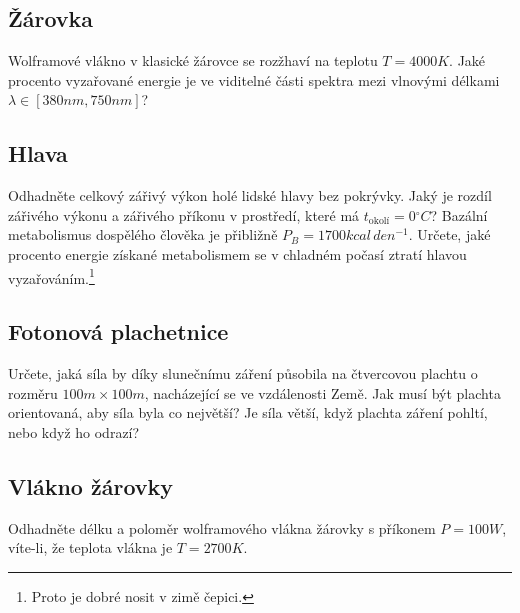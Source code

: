\subsection{Žárovka}
    Wolframové vlákno v klasické žárovce se rozžhaví na teplotu $T=4000\unit{K}$.
    Jaké procento vyzařované energie je ve viditelné části spektra mezi vlnovými délkami $\lambda\in[380\unit{nm},750\unit{nm}]$?

\subsection{Hlava}
    Odhadněte celkový zářivý výkon holé lidské hlavy bez pokrývky.
    Jaký je rozdíl zářivého výkonu a zářivého příkonu v prostředí, které má $t_{\text{okolí}}=0\unit{^\circ C}$?
    Bazální metabolismus dospělého člověka je přibližně $P_{B}=1700\unit{kcal\,den^{-1}}$.
    Určete, jaké procento energie získané metabolismem se v chladném počasí ztratí hlavou vyzařováním.\footnote{
        Proto je dobré nosit v zimě čepici.
    }

\subsection{Fotonová plachetnice}
    Určete, jaká síla by díky slunečnímu záření působila na čtvercovou plachtu o rozměru $100\unit{m}\times 100\unit{m}$, nacházející se ve vzdálenosti Země. 
    Jak musí být plachta orientovaná, aby síla byla co největší?
    Je síla větší, když plachta záření pohltí, nebo když ho odrazí?

\subsection{Vlákno žárovky}
    Odhadněte délku a poloměr wolframového vlákna žárovky s příkonem $P=100\unit{W}$, víte-li, že teplota vlákna je $T=2700\unit{K}$.